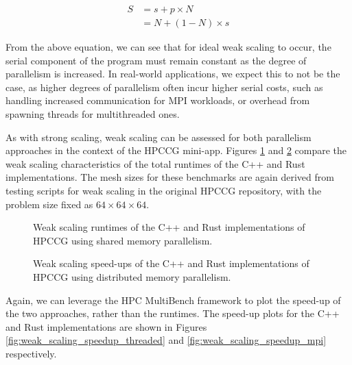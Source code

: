 \begin{align}
    S &= s + p \times N \\
      &= N + (1 - N) \times s
\end{align}

From the above equation, we can see that for ideal weak scaling to occur, the serial component of the program must remain constant as the degree of parallelism is increased. In real-world applications, we expect this to not be the case, as higher degrees of parallelism often incur higher serial costs, such as handling increased communication for MPI workloads, or overhead from spawning threads for multithreaded ones.

As with strong scaling, weak scaling can be assessed for both parallelism approaches in the context of the \acrshort{HPCCG} \acrshort{mini-app}. Figures \ref{fig:weak_scaling_threaded} and \ref{fig:weak_scaling_mpi} compare the weak scaling characteristics of the total runtimes of the C++ and Rust implementations. The mesh sizes for these benchmarks are again derived from testing scripts for weak scaling in the original \acrshort{HPCCG} repository, with the problem size fixed as $64 \times 64 \times 64$.

\begin{figure}[H]
    \centering
    \fbox{}
    \captionsetup{skip=0pt}
    \caption{Weak scaling runtimes of the C++ and Rust implementations of \acrshort{HPCCG} using shared memory parallelism.}
    \label{fig:weak_scaling_threaded}
\end{figure}

\begin{figure}[H]
    \centering
    \fbox{}
    \captionsetup{skip=0pt}
    \caption{Weak scaling speed-ups of the C++ and Rust implementations of \acrshort{HPCCG} using distributed memory parallelism.}
    \label{fig:weak_scaling_mpi}
\end{figure}

Again, we can leverage the HPC MultiBench framework to plot the speed-up of the two approaches, rather than the runtimes. The speed-up plots for the C++ and Rust implementations are shown in Figures \ref{fig:weak_scaling_speedup_threaded} and \ref{fig:weak_scaling_speedup_mpi} respectively.

